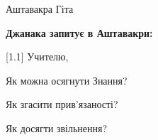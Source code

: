 \thispagestyle{empty}
\vspace*{\fill}
\begin{LARGE}
\begin{center}
Аштавакра Гіта
\end{center}
\end{LARGE}

\vspace*{\fill}
\textbf{Джанака запитує в Аштавакри:}

[1.1] Учителю,

Як можна осягнути Знання?

Як згасити прив'язаності?

Як досягти звільнення?
